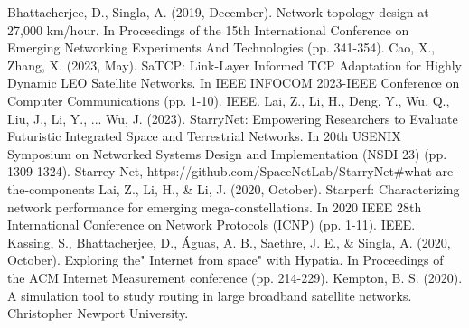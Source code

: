 \documentclass[conference]{IEEEtran}
\begin{document}
\begin{thebibliography}{00}
 Bhattacherjee, D.,  Singla, A. (2019, December). Network topology design at 27,000 km/hour. In Proceedings of the 15th International Conference on Emerging Networking Experiments And Technologies (pp. 341-354).
 Cao, X.,  Zhang, X. (2023, May). SaTCP: Link-Layer Informed TCP Adaptation for Highly Dynamic LEO Satellite Networks. In IEEE INFOCOM 2023-IEEE Conference on Computer Communications (pp. 1-10). IEEE.
  Lai, Z., Li, H., Deng, Y., Wu, Q., Liu, J., Li, Y., ...  Wu, J. (2023). {StarryNet}: Empowering Researchers to Evaluate Futuristic Integrated Space and Terrestrial Networks. In 20th USENIX Symposium on Networked Systems Design and Implementation (NSDI 23) (pp. 1309-1324).
 Starrey Net, https://github.com/SpaceNetLab/StarryNet\#what-are-the-components
 Lai, Z., Li, H., \& Li, J. (2020, October). Starperf: Characterizing network performance for emerging mega-constellations. In 2020 IEEE 28th International Conference on Network Protocols (ICNP) (pp. 1-11). IEEE.
 Kassing, S., Bhattacherjee, D., Águas, A. B., Saethre, J. E., \& Singla, A. (2020, October). Exploring the" Internet from space" with Hypatia. In Proceedings of the ACM Internet Measurement conference (pp. 214-229).
 Kempton, B. S. (2020). A simulation tool to study routing in large broadband satellite networks. Christopher Newport University.
\end{thebibliography}
\end{document}
